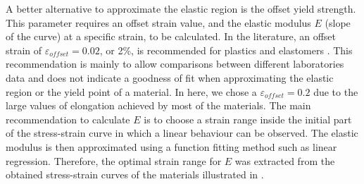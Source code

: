 A better alternative to approximate the elastic region is the offset yield strength. This parameter requires an offset strain value, and the elastic modulus $E$ (slope of the curve) at a specific strain, to be calculated. In the literature, an offset strain of $\varepsilon_{offset}=0.02$, or 2\%, is recommended for plastics and elastomers \cite{instron2019}. This recommendation is mainly to allow comparisons between different laboratories data and does not indicate a goodness of fit when approximating the elastic region or the yield point of a material. In here, we chose a $\varepsilon_{offset}=0.2$ due to the large values of elongation achieved by most of the materials. The main recommendation to calculate $E$ is to choose a strain range inside the initial part of the stress-strain curve in which a linear behaviour can be observed. The elastic modulus is then approximated using a function fitting method such as linear regression. Therefore, the optimal strain range for $E$ was extracted from the obtained stress-strain curves of the materials illustrated in .

